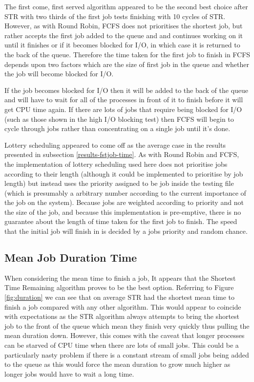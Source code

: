 \documentclass{acm_proc_article-sp}
\begin{document}
The first come, first served algorithm appeared to be the second best choice after STR with two thirds of the first job tests finishing with 10 cycles of STR. However, as with Round Robin, FCFS does not prioritises the shortest job, but rather accepts the first job added to the queue and and continues working on it until it finishes or if it becomes blocked for I/O, in which case it is returned to the back of the queue. Therefore the time taken for the first job to finish in FCFS depends upon two factors which are the size of first job in the queue and whether the job will become blocked for I/O. 

If the job becomes blocked for I/O then it will be added to the back of the queue and will have to wait for all of the processes in front of it to finish before it will get CPU time again. If there are lots of jobs that require being blocked for I/O (such as those shown in the high I/O blocking test) then FCFS will begin to cycle through jobs rather than concentrating on a single job until it's done.

Lottery scheduling appeared to come off as the average case in the results presented in subsection \ref{results-fstjob-time}. As with Round Robin and FCFS, the implementation of lottery scheduling used here does not prioritise jobs according to their length (although it could be implemented to prioritise by job length) but instead uses the priority assigned to be job inside the testing file (which is presumably a arbitrary number according to the current importance of the job on the system). Because jobs are weighted according to priority and not the size of the job, and because this implementation is pre-emptive, there is no guarantee about the length of time taken for the first job to finish. The speed that the initial job will finish in is decided by a jobs priority and random chance.

\subsection{Mean Job Duration Time}
When considering the mean time to finish a job, It appears that the Shortest Time Remaining algorithm proves to be the best option. Referring to Figure \ref{fig:duration} we can see that on average STR had the shortest mean time to finish a job compared with any other algorithm. This would appear to coincide with expectations as the STR algorithm always attempts to bring the shortest job to the front of the queue which mean they finish very quickly thus pulling the mean duration down. However, this comes with the caveat that longer processes can be starved of CPU time when there are lots of small jobs. This could be a particularly nasty problem if there is a constant stream of small jobs being added to the queue as this would force the mean duration to grow much higher as longer jobs would have to wait a long time.
\end{document}
